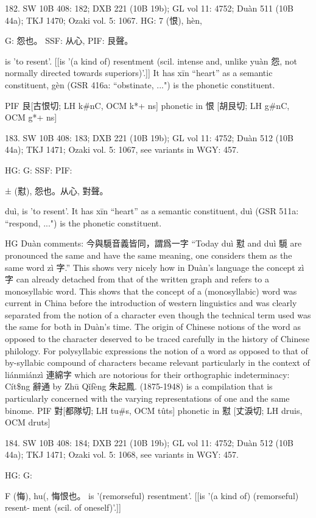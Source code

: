 182. SW 10B 408: 182; DXB 221 (10B 19b); GL vol 11: 4752; Duàn 511 (10B 44a); TKJ 1470; Ozaki vol. 5: 1067.
HG: 7 (恨), hèn,

G:	怨也。
SSF: 从心,
PIF: 艮聲。

is 'to resent'. [[is '(a kind of) resentment (scil. intense and, unlike
yuàn 怨, not normally directed towards superiors)'.]] It has xīn ``heart'' as a semantic constituent,
gèn (GSR 416a: ``obstinate, ...") is the phonetic constituent.

PIF     艮[古恨切; LH k\#nC, OCM k*+ ns] phonetic in 恨 [胡艮切; LH g\#nC, OCM g*+ ns]

183. SW 10B 408: 183; DXB 221 (10B 19b); GL vol 11: 4752; Duàn 512 (10B 44a); TKJ 1471; Ozaki vol. 5: 1067, see
variants in WGY: 457.


HG:
G: SSF: PIF:

± (懟),
怨也。从心, 對聲。


duì,
is 'to resent'.
It has xīn ``heart'' as a semantic constituent,
duì (GSR 511a: ``respond, ...") is the phonetic constituent.

HG Duàn comments: 今與䮭音義皆同，謂爲一字 ``Today duì 懟 and duì 䮭 are pronounced the same and have the same meaning, one considers them as the same word zì 字.'' This shows very nicely how in Duàn's language the concept zì 字 can already detached from that of the written graph and refers to a monosyllabic word. This shows that the concept of a (monosyllabic) word was current in China before the introduction of western linguistics and was clearly separated from the notion of a character even though the technical term used was the same for both in Duàn's time. The origin of Chinese notions of the word as opposed to the character deserved to be traced carefully in the history of Chinese philology. For polysyllabic expressions the notion of a word as opposed to that of by-syllabic compound of characters became relevant particularly in the context of liánmiánzì 連綿字 which are notorious for their orthographic indeterminacy: Cít\$ng 辭通 by Zhū Qǐfèng 朱起鳳. (1875-1948) is a compilation that is particularly concerned with the varying representations of one and the same binome.
PIF    對[都隊切; LH tu\#s, OCM tûts] phonetic in 懟 [丈淚切; LH druis, OCM druts]

184. SW 10B 408: 184; DXB 221 (10B 19b); GL vol 11: 4752; Duàn 512 (10B 44a); TKJ 1471; Ozaki vol. 5: 1068, see
variants in WGY: 457.


HG:
G:

F (悔), hu(,
悔恨也。 is '(remorseful) resentment'. [[is '(a kind of) (remorseful) resent- ment (scil. of oneself)'.]]




